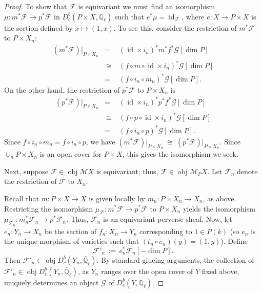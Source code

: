 \documentclass[10pt]{amsart}
\theoremstyle{plain}
\theoremstyle{definition}
\newcommand{\EE}{\mathbb{\bar Q}_\ell}
\newcommand{\Fq}{k}
\DeclareMathOperator{\id}{id}
\DeclareMathOperator{\obj}{obj}
\newcommand{\ceq}{{\, :=\, }}
\newcommand{\iso}{{\ \cong\ }}
\begin{document}
\begin{proof}
To show that $\mathcal{F}$ is equivariant we must find an isomorphism $\mu : {m}^* \mathcal{F} \to p^* \mathcal{F}$ in $D^b_c({P}\times{X}, \EE)$ such that ${e}^*\mu = \id_{\mathcal{F}}$, where ${e} : {X} \to {P}\times{X}$ is the section defined by $x \mapsto (1,x)$. To see this, consider the restriction of ${m}^* \mathcal{F}$ to ${P}\times{X}_n$:
\begin{eqnarray*}
({m}^* \mathcal{F})\vert_{{P}\times {X}_n}
	&=& (\id\times {i}_n)^* {m}^* {f}^* \mathcal{G} [\dim{P}]\\
	&\iso& ({f}\circ {m} \circ \id\times {i}_n)^* \mathcal{G} [\dim{P}]\\
	&=& ({f} \circ {i}_n \circ {m}_n)^* \mathcal{G} [\dim{P}].
\end{eqnarray*}
On the other hand, the restriction of $p^* \mathcal{F}$ to ${P}\times{X}_n$ is 
\begin{eqnarray*}
(p^* \mathcal{F})\vert_{{P}\times {X}_n}
	&=& (\id\times {i}_n)^* p^* {f}^* \mathcal{G} [\dim{P}]\\
	&\iso& ({f}\circ p \circ \id\times {i}_n)^* \mathcal{G} [\dim{P}]\\
	&=& ({f} \circ {i}_n \circ p)^* \mathcal{G} [\dim{P}].
\end{eqnarray*}
Since ${f} \circ {i}_n \circ {m}_n = {f} \circ {i}_n \circ p$, we have $({m}^* {\mathcal{F}})\vert_{{P}\times {X}_n} \iso (p^* \mathcal{F})\vert_{{P}\times {X}_n}$. Since $\cup_n {P}\times{X}_n$ is an open cover for ${P}\times{X}$, this gives the isomorphism we seek.

Next, suppose $\mathcal{F} \in \obj{\mathcal M}{X}$ is equivariant; thus, $\mathcal{F} \in \obj{\mathcal M}_{P}{X}$. Let $\mathcal{F}_n$ denote the restriction of $\mathcal{F}$ to ${X}_n$. 

Recall that ${m}: {P}\times{X} \to {X}$ is given locally by ${m}_n : {P}\times {X}_n \to {X}_n$, as above. Restricting the isomorphism $\mu_{\mathcal{F}} : {m}^* \mathcal{F} \to p^* \mathcal{F}$ to ${P}\times{X}_n$ yields the isomorphism $\mu_{\mathcal{F}_n} : {m}_n^* \mathcal{F}_n \to p^* \mathcal{F}_n$. Thus, $\mathcal{F}_n$ is an equivariant perverse sheaf. Now, let ${e}_n : {Y}_n \to {X}_n$ be the section of ${f}_n : {X}_n \to {Y}_n$ corresponding to $1\in {P}(\Fq)$ (so ${e}_n$ is the unique morphism of varieties such that $({t}_n \circ {e}_n) (y) = (1,y)$). Define
\begin{equation}\label{equation: torsor 5}
	\mathcal{F}'_n \ceq {e}_n^* \mathcal{F}_n [-\dim{P}].
\end{equation}
Then $\mathcal{F}'_n \in \obj D^b_c({Y}_n, \EE)$. By standard glueing arguments, the collection of $\mathcal{F}'_n \in\obj D^b_c({Y}_n, \EE)$, as ${Y}_n$ ranges over the open cover of ${Y}$ fixed above, uniquely determines an object $\mathcal{G}$ of $D^b_c({Y}, \EE)$.


\end{proof}
\end{document}
